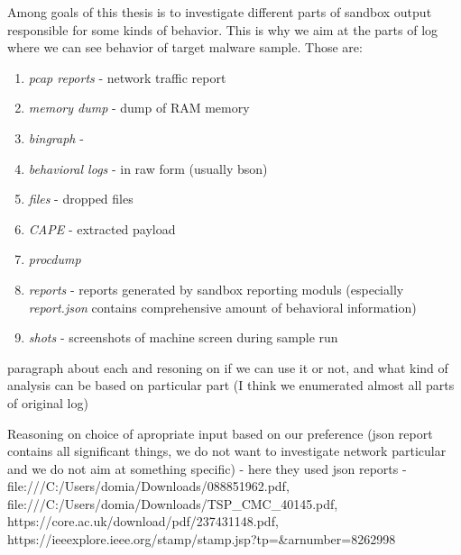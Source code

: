 Among goals of this thesis is to investigate different parts of sandbox output responsible for some kinds of behavior. This is why we aim at the parts of log where we can see behavior of target malware sample. Those are:
\begin{enumerate}
  \item \emph{pcap reports} - network traffic report
  \item \emph{memory dump} - dump of RAM memory
  \item \emph{bingraph} - 
  \item \emph{behavioral logs} - in raw form (usually bson)
  \item \emph{files} - dropped files
  \item \emph{CAPE} -  extracted payload
  \item \emph{procdump}
  \item \emph{reports} - reports generated by sandbox reporting moduls (especially \emph{report.json} contains comprehensive amount of behavioral information)
  \item \emph{shots} - screenshots of machine screen during sample run
\end{enumerate}


paragraph about each and resoning on if we can use it or not, and what kind of analysis can be based on particular part (I think we enumerated almost all parts of original log)


Reasoning on choice of apropriate input based on our preference (json report contains all significant things, we do not want to investigate network particular and we do not aim at something specific)
- here they used json reports - file:///C:/Users/domia/Downloads/088851962.pdf, file:///C:/Users/domia/Downloads/TSP_CMC_40145.pdf, https://core.ac.uk/download/pdf/237431148.pdf, https://ieeexplore.ieee.org/stamp/stamp.jsp?tp=&arnumber=8262998



